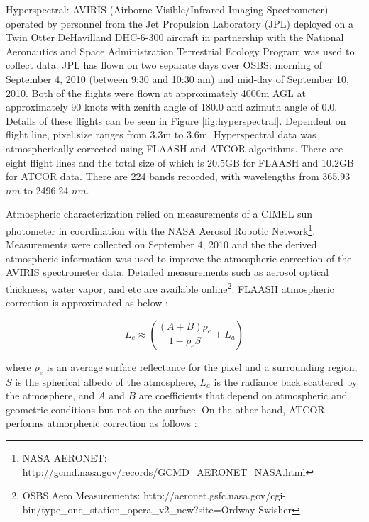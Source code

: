 \documentclass[remotesensing,article,accept,moreauthors,pdftex,12pt,a4paper]{mdpi}
\begin{document}
Hyperspectral: AVIRIS (Airborne Visible/Infrared Imaging Spectrometer) operated by personnel from the Jet Propulsion Laboratory (JPL) deployed on a Twin Otter DeHavilland DHC-6-300 aircraft in partnership with the National Aeronautics and Space Administration Terrestrial Ecology Program was used to collect data. JPL has flown on two separate days over OSBS: morning of September 4, 2010 (between 9:30 and 10:30 am) and mid-day of September 10, 2010. Both of the flights were flown at approximately 4000m AGL at approximately 90 knots with zenith angle of 180.0 and azimuth angle of 0.0. Details of these flights can be seen in Figure \ref{fig:hyperspectral}. Dependent on flight line, pixel size ranges from 3.3m to 3.6m. Hyperspectral data was atmospherically corrected using FLAASH \cite{adler1998flaash} and ATCOR \cite{richter2005atmospheric} algorithms. There are eight flight lines and the total size of which is 20.5GB for FLAASH and 10.2GB for ATCOR data. There are 224 bands recorded, with wavelengths from 365.93 $nm$ to 2496.24 $nm$. 

Atmospheric characterization relied on measurements of a CIMEL sun photometer in coordination with the NASA Aerosol Robotic Network\footnote{NASA AERONET: http://gcmd.nasa.gov/records/GCMD\_AERONET\_NASA.html}. Measurements were collected on September 4, 2010 and the the derived atmospheric information was used to improve the atmospheric correction of the AVIRIS spectrometer data. Detailed measurements such as aerosol optical thickness, water vapor, and etc are available online\footnote{OSBS Aero Measurements: http://aeronet.gsfc.nasa.gov/cgi-bin/type\_one\_station\_opera\_v2\_new?site=Ordway-Swisher}. FLAASH atmospheric correction is approximated as below \cite{adler1999atmospheric}:

\begin{equation}
L_e \approx (\frac{(A+B)\rho_e}{1-\rho_e S}+L_a)
\end{equation}

where $ \rho_e$ is an average surface reflectance for the pixel and a surrounding region, $S$ is the spherical albedo of the atmosphere, $L_a$ is the radiance back scattered by the atmosphere, and $A$ and $B$ are coefficients that depend on atmospheric and geometric conditions but not on the surface. On the other hand, ATCOR performs atmorpheric correction as follows \cite{Richter2014atcor}:
\end{document}
